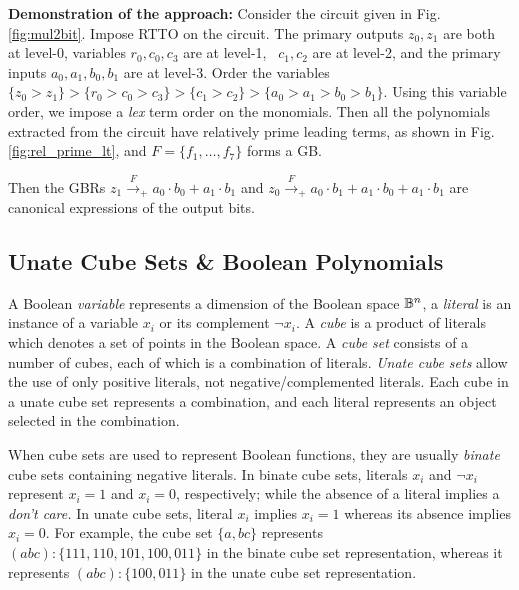 \vspace{-0.1in}
\begin{Example}
\label{ex1}
{\bf Demonstration of the approach:} Consider the circuit given in
Fig. \ref{fig:mul2bit}. 
Impose RTTO on the circuit. The primary outputs $z_0, z_1$ are both at
level-0, variables $r_0, c_0, c_3$ are at level-1, ~$c_1, c_2$ are at
level-2, and the primary inputs $a_0, a_1, b_0, b_1$ are at
level-3. Order the variables $\{z_0 > z_1\} > \{r_0 > c_0 > c_3\} >
\{c_1 > c_2\} > \{a_0 > a_1 > b_0 > b_1\}$. Using this variable order,
we impose a {\it lex} term order on the monomials. Then all the
polynomials extracted from the circuit have relatively prime leading
terms, as shown in Fig. \ref{fig:rel_prime_lt}, and $F = \{f_1, \dots,
f_7\}$ forms a GB. 

Then the GBRs $z_1\xrightarrow{F}_+ a_0\cdot b_0 + a_1\cdot b_1$ and
$z_0\xrightarrow{F}_+a_0\cdot b_1+a_1\cdot b_0 + a_1\cdot b_1$ are
canonical expressions of the output bits. 
\end{Example}

\subsection{Unate Cube Sets \& Boolean Polynomials}

A Boolean {\it variable}
represents a dimension of the Boolean space ${\mathbb{B}}^n$, a {\it literal}
is an instance of a variable $x_i$ or its 
complement $\neg x_i$. A {\it cube} is a product of literals
which denotes a set of points in the Boolean space. A {\it cube set}
consists of a number of cubes, each of which is a combination of
literals. {\it Unate cube sets} allow the use of only positive
literals, not negative/complemented literals. Each cube in a unate
cube set represents a combination, and each literal represents an
object selected in the combination.

When cube sets are used to represent Boolean functions, they are
usually {\it binate} cube sets containing negative literals. In binate
cube sets, literals $x_i$ and $\neg x_i$ represent $x_i = 1$ and $x_i = 0$,
respectively; while the absence of a literal implies a {\it don't
  care.} In unate cube sets, literal $x_i$ implies $x_i = 1$ whereas
its absence implies $x_i = 0$. For example, the cube set $\{a,
bc\}$ represents $(abc): \{111, 110, 101, 100, 011\}$ in the binate
cube set representation, whereas it represents $(abc): \{100, 011\}$
in the unate cube set representation.

